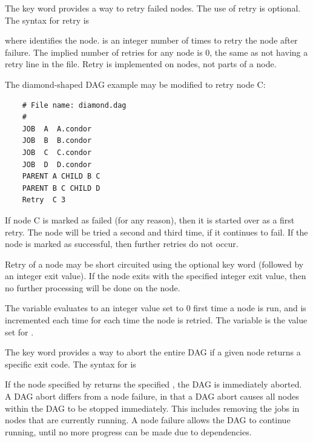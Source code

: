 
The  key word provides a
way to retry failed nodes.
The use of retry is optional.
The syntax for retry is

   

where  identifies the node.
 is an integer
number of times to retry the node after failure.
The implied number of retries for any node is 0,
the same as not having a retry line in the file. 
Retry is implemented on nodes, not parts of a node.

The diamond-shaped DAG example may be modified to
retry node C:

\footnotesize
\begin{verbatim}
    # File name: diamond.dag
    #
    JOB  A  A.condor 
    JOB  B  B.condor 
    JOB  C  C.condor	
    JOB  D  D.condor
    PARENT A CHILD B C
    PARENT B C CHILD D
    Retry  C 3
\end{verbatim}
\normalsize

If node C is marked as failed (for any reason),
then it is started over as a first retry.
The node will be tried a second and third time,
if it continues to fail.
If the node is marked as successful, then further retries do not occur.

Retry of a node may be short circuited using the
optional key word  (followed by an
integer exit value).
If the node exits with the specified integer exit value,
then no further processing will be done
on the node. 

The variable  evaluates to an 
integer value set to 0 first time a node is run,
and is  incremented each time for each time the node is retried. 
The variable  is the value set for
.


The  key word provides a way
to abort the entire DAG if a given node returns a specific exit
code.  The syntax for  is

  

If the node specified by  returns the specified
, the
DAG is immediately aborted.
A DAG abort differs from a node failure,
in that a DAG abort causes all nodes within the DAG to be stopped immediately.
This includes removing the jobs in nodes that are currently running.
A node failure allows the DAG to continue running,
until no more progress can be made due to dependencies.

